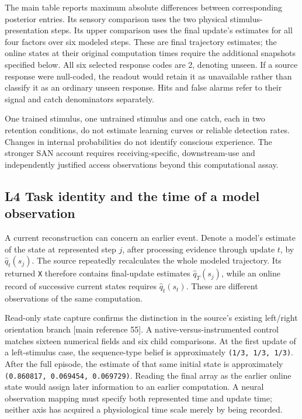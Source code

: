 \documentclass[
  american,
  11pt,
  letterpaper,
]{article}
\begin{document}
The main table reports maximum absolute differences between corresponding posterior entries. Its sensory comparison uses the two physical stimulus-presentation steps. Its upper comparison uses the final update's estimates for all four factors over six modeled steps. These are final trajectory estimates; the online states at their original computation times require the additional snapshots specified below. All six selected response codes are 2, denoting unseen. If a source response were null-coded, the readout would retain it as unavailable rather than classify it as an ordinary unseen response. Hits and false alarms refer to their signal and catch denominators separately.

One trained stimulus, one untrained stimulus and one catch, each in two retention conditions, do not estimate learning curves or reliable detection rates. Changes in internal probabilities do not identify conscious experience. The stronger SAN account requires receiving-specific, downstream-use and independently justified access observations beyond this computational assay.

\subsection{L4 Task identity and the time of a model observation}\label{l4-task-identity-and-the-time-of-a-model-observation}

A current reconstruction can concern an earlier event. Denote a model's estimate of the state at represented step \(j\), after processing evidence through update \(t\), by \(\hat q_t(s_j)\). The source repeatedly recalculates the whole modeled trajectory. Its returned \texttt{X} therefore contains final-update estimates \(\hat q_T(s_j)\), while an online record of successive current states requires \(\hat q_t(s_t)\). These are different observations of the same computation.

Read-only state capture confirms the distinction in the source's existing left/right orientation branch {[}main reference 55{]}. A native-versus-instrumented control matches sixteen numerical fields and six child comparisons. At the first update of a left-stimulus case, the sequence-type belief is approximately \texttt{(1/3,\ 1/3,\ 1/3)}. After the full episode, the estimate of that same initial state is approximately \texttt{(0.860817,\ 0.069454,\ 0.069729)}. Reading the final array as the earlier online state would assign later information to an earlier computation. A neural observation mapping must specify both represented time and update time; neither axis has acquired a physiological time scale merely by being recorded.
\end{document}
